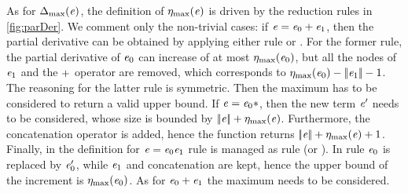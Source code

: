 As for ${\Delta_{\max}}({\mathit {e}})$, the definition of ${\eta_{\max}}({\mathit {e}})$ is driven by the reduction rules in \cref{fig:parDer}. We comment only the non-trivial cases: if $\mathit {e}=\mathit {e}_0\mathbin{+}\mathit {e}_1$, then the partial derivative can be obtained
by applying either rule  or . For the former rule,
the partial derivative of $\mathit {e}_0$ can increase of at most ${\eta_{\max}}({\mathit {e}_0})$, but all the nodes of $\mathit {e}_1$ and the $\mathbin{+}$ operator are removed, which corresponds to ${\eta_{\max}}({\mathit {e}_0})-{{\mid\!\mid}}{\mathit {e}_1}{{\mid\!\mid}}-1$. The reasoning for the latter rule is symmetric. Then the maximum has to be considered to return a valid upper bound.
If $\mathit {e}={\mathit {e}_0}*$, then the new term $\mathit {e}'$ needs to be considered, whose size is bounded by ${{\mid\!\mid}}{\mathit {e}}{{\mid\!\mid}}+{\eta_{\max}}({\mathit {e}})$. Furthermore, the concatenation operator is added, hence the function returns ${{\mid\!\mid}}{\mathit {e}}{{\mid\!\mid}}+{\eta_{\max}}({\mathit {e}})+1$. Finally, in the definition for $\mathit {e}=\mathit {e}_0\mathit {e}_1$ rule  is managed as rule  (or ).
In rule  $\mathit {e}_0$ is replaced by $\mathit {e}_0'$, while $\mathit {e}_1$ and concatenation are kept, hence the upper bound of the increment is ${\eta_{\max}}({\mathit {e}_0})$. As for $\mathit {e}_0\mathbin{+}\mathit {e}_1$ the maximum needs to be considered.

